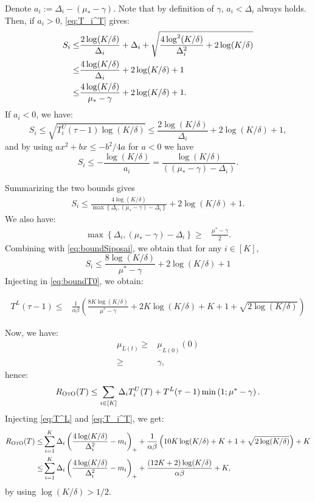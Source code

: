 Denote $a_i:=\Delta_i-(\mu_*-\gamma)$. Note that by definition of $\gamma$, $a_i<\Delta_i$ always holds. Then,  if $a_i>0$, \cref{eq:T_i^T} gives:
\begin{align}
S_i\leq& \frac{2 \log(K/\delta)}{\Delta_i}+\Delta_i+\sqrt{\frac{4 \log^2(K/\delta)}{\Delta_i^2}+2\log(K/\delta)}\notag\\
\leq&\frac{4 \log(K/\delta)}{\Delta_i}+2\log(K/\delta)+1\notag\\
\leq &\frac{4 \log(K/\delta)}{\mu_*-\gamma}+2\log(K/\delta)+1.\label{eq:boundSiposai}
\end{align}
If $a_i<0$, we have:
\[
S_i\leq \sqrt{T^U_i(\tau-1)\log(K/\delta)}\leq \frac{2 \log(K/\delta)}{\Delta_i}+2\log(K/\delta)+1,
\]
and by using $a x^2+b x \leq-b^2 / 4 a$ for $a<0$ we have
\[
S_i \leq-\frac{\log(K/\delta)}{ a_i}=\frac{\log(K/\delta)}{\left((\mu_*-\gamma)-\Delta_i\right)} .
\]

Summarizing the two bounds gives
\begin{align}
S_i \leq \frac{4 \log(K/\delta)}{\max \left\{\Delta_i, (\mu_*-\gamma)-\Delta_i\right\}}+2\log(K/\delta)+1 .\label{eq:boundSi}
\end{align}
We also have:
\begin{align*}
    \max \left\{\Delta_i, (\mu_*-\gamma)-\Delta_i\right\}\geq &\frac{\mu^*-\gamma}{2}.
\end{align*}
Combining with \cref{eq:boundSiposai}, we obtain that for any $i\in [K]$,
\[
S_i\leq \frac{8 \log(K/\delta)}{\mu^*-\gamma}+2\log(K/\delta)+1
\]
Injecting in \cref{eq:boundT0}, we obtain:

\begin{align}\label{eq:T^L}
T^L(\tau-1) \leq &\frac{1}{\alpha \beta}\left(\frac{8 K\log(K/\delta)}{\mu^*-\gamma}+2K\log(K/\delta)+K+1+\sqrt{2\log(K/\delta)}\right)
\end{align}

Now, we have:
\begin{align*}
    \mu_{L(t)}\geq& \underline{\mu}_{L(0)}(0)\\
    \geq& \gamma,
\end{align*}
hence:
\begin{align*}
   R_\textsc{OtO}(T)\leq \sum_{i \in [K]}\Delta_i T^U_i(T)+T^L(\tau-1) \min\left(1;\mu^*-\gamma\right).
\end{align*}
Injecting \cref{eq:T^L} and \cref{eq:T_i^T}, we get:
\begin{align*}
   R_\textsc{OtO}(T)\leq&\sum_{i=1}^K\Delta_i\left(\frac{4\log(K/\delta)}{\Delta_i^2}-m_i\right)_++\frac{1}{\alpha \beta}\left(10 K\log(K/\delta)+K+1+\sqrt{2\log(K/\delta)}\right)+K\\
   \leq&\sum_{i=1}^K\Delta_i\left(\frac{4\log(K/\delta)}{\Delta_i^2}-m_i\right)_++\frac{(12 K+2)\log(K/\delta)}{\alpha \beta}+K,
\end{align*}
by using $\log(K/\delta)>1/2$.

